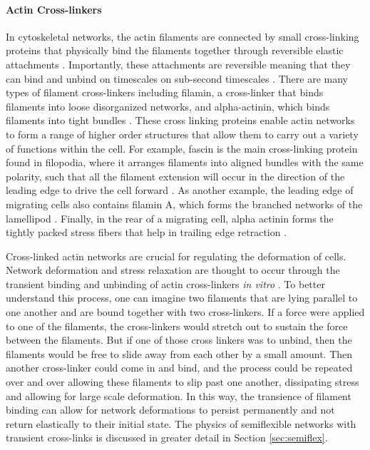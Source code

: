 \paragraph{Actin Cross-linkers}  In cytoskeletal networks, the actin filaments are connected by small cross-linking proteins that physically bind the filaments together through reversible elastic attachments \cite{B912163N}. Importantly, these attachments are reversible meaning that they can bind and unbind on timescales on sub-second timescales \cite{B912163N}.  There are many types of filament cross-linkers including filamin, a cross-linker that  binds filaments into loose disorganized networks, and  alpha-actinin, which  binds filaments into tight bundles \cite{B912163N}.   These cross linking proteins enable actin networks to form a range of higher order structures that allow them to carry out a variety of functions within the cell.  For example, fascin is the main cross-linking protein found in filopodia, where it arranges filaments into aligned bundles with the same polarity, such that all the filament extension will occur in the direction of the leading edge to drive the cell forward \cite{Ross2000658}. As another example, the leading edge of migrating cells also contains filamin A, which forms the branched networks of the lamellipod \cite{Cunningham325}. Finally, in the rear of a migrating cell, alpha actinin forms the tightly packed stress fibers that help in trailing edge retraction \cite{Zaidel-Bar2007}.  

Cross-linked actin networks are crucial for regulating the deformation of cells.  Network deformation and stress relaxation are thought to occur through the transient binding and unbinding of actin cross-linkers\cite{Ahmed26052015} \textit{in vitro} \cite{PhysRevLett.101.108101}.  To better understand this process, one can imagine two filaments that are lying parallel to one another and are bound together with two cross-linkers.  If a force were applied to one of the filaments, the cross-linkers would stretch out to sustain the force between the filaments.  But if one of those cross linkers was to unbind, then the filaments would be free to slide away from each other by a small amount.  Then another cross-linker could come in and bind, and the process could be repeated over and over allowing these filaments to slip past one another, dissipating stress and allowing for large scale deformation.  In this way, the transience of filament binding can allow for network deformations to persist permanently and not return elastically to their initial state.  The physics of semiflexible networks with transient cross-links is discussed in greater detail in Section \ref{sec:semiflex}.

